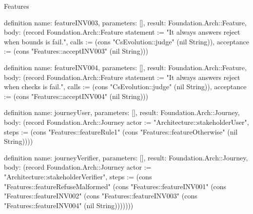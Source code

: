 \begin{lexlean}{Features}
\begin{semanticmodule}
definition{
  name: featureINV003,
  parameters: [],
  result: Foundation.Arch::Feature,
  body: (record Foundation.Arch::Feature {statement := "It always answers reject when bounds is fail.", calls := (cons "CsEvolution::judge" (nil String)), acceptance := (cons "Features::acceptINV003" (nil String))})
}

definition{
  name: featureINV004,
  parameters: [],
  result: Foundation.Arch::Feature,
  body: (record Foundation.Arch::Feature {statement := "It always answers reject when checks is fail.", calls := (cons "CsEvolution::judge" (nil String)), acceptance := (cons "Features::acceptINV004" (nil String))})
}

definition{
  name: journeyUser,
  parameters: [],
  result: Foundation.Arch::Journey,
  body: (record Foundation.Arch::Journey {actor := "Architecture::stakeholderUser", steps := (cons "Features::featureRule1" (cons "Features::featureOtherwise" (nil String)))})
}

definition{
  name: journeyVerifier,
  parameters: [],
  result: Foundation.Arch::Journey,
  body: (record Foundation.Arch::Journey {actor := "Architecture::stakeholderVerifier", steps := (cons "Features::featureRefuseMalformed" (cons "Features::featureINV001" (cons "Features::featureINV002" (cons "Features::featureINV003" (cons "Features::featureINV004" (nil String))))))})
}
\end{semanticmodule}
\end{lexlean}
